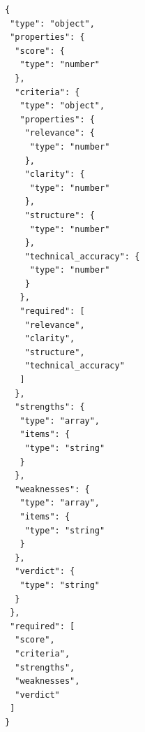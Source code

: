 \begin{lstlisting}[style=adamjson]
{
 "type": "object",
 "properties": {
  "score": {
   "type": "number"
  },
  "criteria": {
   "type": "object",
   "properties": {
    "relevance": {
     "type": "number"
    },
    "clarity": {
     "type": "number"
    },
    "structure": {
     "type": "number"
    },
    "technical_accuracy": {
     "type": "number"
    }
   },
   "required": [
    "relevance",
    "clarity",
    "structure",
    "technical_accuracy"
   ]
  },
  "strengths": {
   "type": "array",
   "items": {
    "type": "string"
   }
  },
  "weaknesses": {
   "type": "array",
   "items": {
    "type": "string"
   }
  },
  "verdict": {
   "type": "string"
  }
 },
 "required": [
  "score",
  "criteria",
  "strengths",
  "weaknesses",
  "verdict"
 ]
}
\end{lstlisting}
